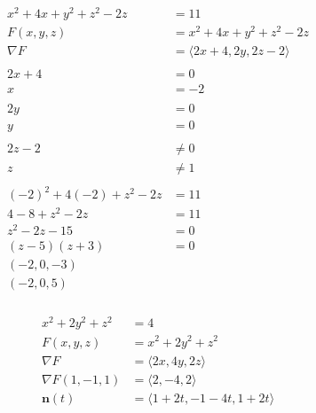 \documentclass{article}
\begin{document}
\begin{align*}
  x^2 + 4 x + y^2 + z^2 - 2 z & = 11                                    \\
  F(x, y, z)                  & = x^2 + 4 x + y^2 + z^2 - 2 z           \\
  \nabla F                    & = \langle 2 x + 4, 2 y, 2 z - 2 \rangle \\ \\
  2 x + 4                     & = 0                                     \\
  x                           & = -2                                    \\ \\
  2 y                         & = 0                                     \\
  y                           & = 0                                     \\ \\
  2 z - 2                     & \ne 0                                   \\
  z                           & \ne 1                                   \\ \\
  (-2)^2 + 4 (-2) + z^2 - 2 z & = 11                                    \\
  4 - 8 + z^2 - 2 z           & = 11                                    \\
  z^2 - 2 z - 15              & = 0                                     \\
  (z - 5) (z + 3)             & = 0                                     \\
  (-2, 0, -3)                                                           \\
  (-2, 0, 5)
\end{align*}

\setcounter{subsubsection}{32}
\subsubsection{}

\begin{align*}
  x^2 + 2 y^2 + z^2  & = 4                                          \\
  F(x, y, z)         & = x^2 + 2 y^2 + z^2                          \\
  \nabla F           & = \langle 2 x, 4 y, 2 z \rangle              \\
  \nabla F(1, -1, 1) & = \langle 2, -4, 2 \rangle                   \\
  \mathbf{n}(t)      & = \langle 1 + 2 t, -1 - 4 t, 1 + 2 t \rangle
\end{align*}
\end{document}
